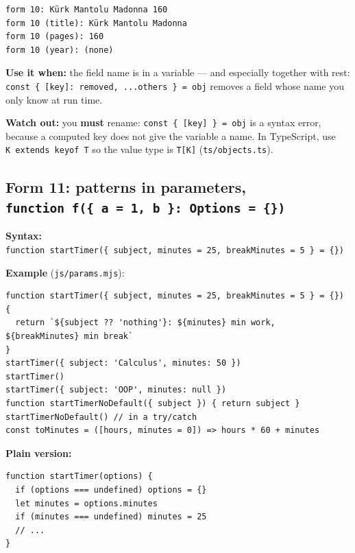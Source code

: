 \documentclass[
  10pt,
]{article}
\begin{document}
\begin{verbatim}
form 10: Kürk Mantolu Madonna 160
form 10 (title): Kürk Mantolu Madonna
form 10 (pages): 160
form 10 (year): (none)
\end{verbatim}

\textbf{Use it when:} the field name is in a variable --- and especially
together with rest:
\texttt{const\ \{\ {[}key{]\allowbreak{}}:\ removed,\ .\allowbreak{}.\allowbreak{}.\allowbreak{}others\ \}\ =\ obj}
removes a field whose name you only know at run time.

\textbf{Watch out:} you \textbf{must} rename:
\texttt{const\ \{\ {[}key{]\allowbreak{}}\ \}\ =\ obj} is a syntax
error, because a computed key does not give the variable a name. In
TypeScript, use \texttt{K\ extends\ keyof\ T} so the value type is
\texttt{T{[}K{]\allowbreak{}}}
(\texttt{ts/\allowbreak{}objects.\allowbreak{}ts}).

\hypertarget{form-11-patterns-in-parameters-function-f-a--1-b--options--}{%
\subsection{\texorpdfstring{Form 11: patterns in parameters,
\texttt{function\ f(\{\ a\ =\ 1,\ b\ \}:\ Options\ =\ \{\})}}{Form 11: patterns in parameters, }}\label{form-11-patterns-in-parameters-function-f-a--1-b--options--}}

\textbf{Syntax:}
\texttt{function\ startTimer(\{\ subject,\ minutes\ =\ 25,\ breakMinutes\ =\ 5\ \}\ =\ \{\})}

\textbf{Example} (\texttt{js/\allowbreak{}params.\allowbreak{}mjs}):

\begin{verbatim}
function startTimer({ subject, minutes = 25, breakMinutes = 5 } = {}) {
  return `${subject ?? 'nothing'}: ${minutes} min work, ${breakMinutes} min break`
}
startTimer({ subject: 'Calculus', minutes: 50 })
startTimer()
startTimer({ subject: 'OOP', minutes: null })
function startTimerNoDefault({ subject }) { return subject }
startTimerNoDefault() // in a try/catch
const toMinutes = ([hours, minutes = 0]) => hours * 60 + minutes
\end{verbatim}

\textbf{Plain version:}

\begin{verbatim}
function startTimer(options) {
  if (options === undefined) options = {}
  let minutes = options.minutes
  if (minutes === undefined) minutes = 25
  // ...
}
\end{verbatim}
\end{document}
